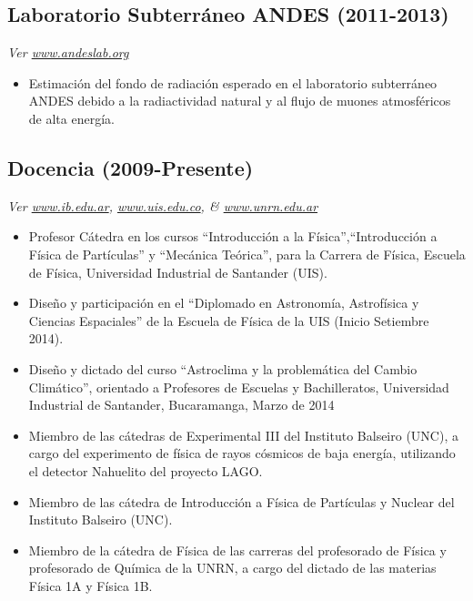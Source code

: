 \subsection*{Laboratorio Subterráneo ANDES (2011-2013)}
{\small{\textit{Ver \href{http://www.andeslab.org}{www.andeslab.org}}}}
\begin{itemize}
\item Estimación del fondo de radiación esperado en el laboratorio subterráneo ANDES debido a la radiactividad natural y al flujo de muones atmosféricos de alta energía.
\end{itemize}

\subsection*{Docencia (2009-Presente)}
{\small{\textit{Ver \href{http://www.ib.edu.ar}{www.ib.edu.ar}, \href{http://www.uis.edu.co}{www.uis.edu.co}, \& \href{http://www.unrn.edu.ar}{www.unrn.edu.ar}}}}
\begin{itemize}
\item Profesor Cátedra en los cursos ``Introducción a la Física'',``Introducción a Física de Partículas'' y ``Mecánica Teórica'', para la Carrera de Física, Escuela de Física, Universidad Industrial de Santander (UIS).
\item Diseño y participación en el ``Diplomado en Astronomía, Astrofísica y Ciencias Espaciales'' de la Escuela de Física de la UIS (Inicio Setiembre 2014).
\item Diseño y dictado del curso ``Astroclima y la problemática del Cambio Climático'', orientado a Profesores de Escuelas y Bachilleratos, Universidad Industrial de Santander, Bucaramanga, Marzo de 2014
\item Miembro de las cátedras de Experimental III del Instituto Balseiro (UNC), a cargo del experimento de física de rayos cósmicos de baja energía, utilizando el detector Nahuelito del proyecto LAGO.
\item Miembro de las cátedra de Introducción a Física de Partículas y Nuclear del Instituto Balseiro (UNC).
\item Miembro de la cátedra de Física de las carreras del profesorado de Física y profesorado de Química de la UNRN, a cargo del dictado de las materias Física 1A y Física 1B.
\end{itemize}
\fi
